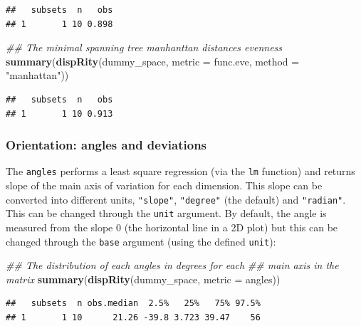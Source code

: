 \documentclass[
]{book}
\newenvironment{Shaded}{\begin{snugshade}}{\end{snugshade}}
\newcommand{\CommentTok}[1]{\textcolor[rgb]{0.56,0.35,0.01}{\textit{#1}}}
\newcommand{\DataTypeTok}[1]{\textcolor[rgb]{0.13,0.29,0.53}{#1}}
\newcommand{\KeywordTok}[1]{\textcolor[rgb]{0.13,0.29,0.53}{\textbf{#1}}}
\newcommand{\NormalTok}[1]{#1}
\newcommand{\StringTok}[1]{\textcolor[rgb]{0.31,0.60,0.02}{#1}}
\begin{document}
\begin{verbatim}
##   subsets  n   obs
## 1       1 10 0.898
\end{verbatim}

\begin{Shaded}
\begin{Highlighting}[]
\CommentTok{\#\# The minimal spanning tree manhanttan distances evenness}
\KeywordTok{summary}\NormalTok{(}\KeywordTok{dispRity}\NormalTok{(dummy\_space, }\DataTypeTok{metric =}\NormalTok{ func.eve,}
                 \DataTypeTok{method =} \StringTok{"manhattan"}\NormalTok{))}
\end{Highlighting}
\end{Shaded}

\begin{verbatim}
##   subsets  n   obs
## 1       1 10 0.913
\end{verbatim}

\hypertarget{orientation-angles-and-deviations}{%
\subsubsection{Orientation: angles and deviations}\label{orientation-angles-and-deviations}}

The \texttt{angles} performs a least square regression (via the \texttt{lm} function) and returns slope of the main axis of variation for each dimension. This slope can be converted into different units, \texttt{"slope"}, \texttt{"degree"} (the default) and \texttt{"radian"}. This can be changed through the \texttt{unit} argument.
By default, the angle is measured from the slope 0 (the horizontal line in a 2D plot) but this can be changed through the \texttt{base} argument (using the defined \texttt{unit}):

\begin{Shaded}
\begin{Highlighting}[]
\CommentTok{\#\# The distribution of each angles in degrees for each}
\CommentTok{\#\# main axis in the matrix}
\KeywordTok{summary}\NormalTok{(}\KeywordTok{dispRity}\NormalTok{(dummy\_space, }\DataTypeTok{metric =}\NormalTok{ angles))}
\end{Highlighting}
\end{Shaded}

\begin{verbatim}
##   subsets  n obs.median  2.5%   25%   75% 97.5%
## 1       1 10      21.26 -39.8 3.723 39.47    56
\end{verbatim}
\end{document}
